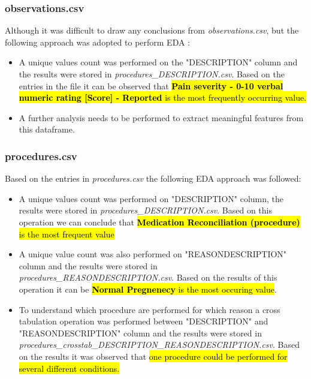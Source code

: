 \documentclass[12pt, twosided]{report}  %
\begin{document}
\subsubsection{observations.csv}
Although it was difficult to draw any conclusions from \textit{observations.csv}, but the following approach was adopted to perform EDA :

\begin{itemize}
	\item A unique values count was performed on the "DESCRIPTION" column and the results were stored in \textit{procedures\_DESCRIPTION.csv}. Based on the entries in the file it can be observed that \hl{\textbf{Pain severity - 0-10 verbal numeric rating [Score] - Reported} is the most frequently occurring value.}
	
	\item A further analysis needs to be performed to extract meaningful features from this dataframe. 
\end{itemize}

\subsubsection{procedures.csv}

Based on the entries in \textit{procedures.csv} the following EDA approach was followed:
\begin{itemize}
	\item A unique values count was performed on "DESCRIPTION" column, the results were stored in \textit{procedures\_DESCRIPTION.csv}. Based on this operation we can conclude that \hl{\textbf{Medication Reconciliation (procedure)} is the most frequent value}
	
	\item A unique value count was also performed on "REASONDESCRIPTION" column and the results were stored in \textit{procedures\_REASONDESCRIPTION.csv}. Based on the results of this operation it can be \hl{\textbf{Normal Pregnenecy} is the most occuring value}.
	
	\item To understand which procedure are performed for which reason a cross tabulation operation was performed between "DESCRIPTION" and "REASONDESCRIPTION" column and the results were stored in \textit{procedures\_crosstab\_DESCRIPTION\_REASONDESCRIPTION.csv}. Based on the results it was observed that \hl{one procedure could be performed for several different conditions.}
	
\end{itemize} 



%
%
\end{document}
